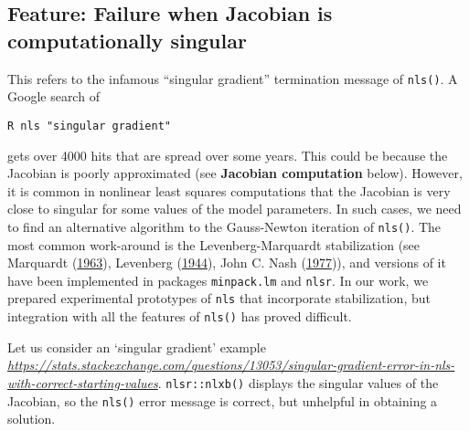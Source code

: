 \documentclass[
]{article}
\begin{document}
\hypertarget{feature-failure-when-jacobian-is-computationally-singular}{%
\subsection{Feature: Failure when Jacobian is computationally
singular}\label{feature-failure-when-jacobian-is-computationally-singular}}

This refers to the infamous ``singular gradient'' termination message of
\texttt{nls()}. A Google search of

\begin{verbatim}
R nls "singular gradient"
\end{verbatim}

gets over 4000 hits that are spread over some years. This could be
because the Jacobian is poorly approximated (see \textbf{Jacobian
computation} below). However, it is common in nonlinear least squares
computations that the Jacobian is very close to singular for some values
of the model parameters. In such cases, we need to find an alternative
algorithm to the Gauss-Newton iteration of \texttt{nls()}. The most
common work-around is the Levenberg-Marquardt stabilization (see
Marquardt (\protect\hyperlink{ref-Marquardt1963}{1963}), Levenberg
(\protect\hyperlink{ref-Levenberg1944}{1944}), John C. Nash
(\protect\hyperlink{ref-jn77ima}{1977})), and versions of it have been
implemented in packages \texttt{minpack.lm} and \texttt{nlsr}. In our
work, we prepared experimental prototypes of \texttt{nls} that
incorporate stabilization, but integration with all the features of
\texttt{nls()} has proved difficult.

Let us consider an `singular gradient' example
\emph{\url{https://stats.stackexchange.com/questions/13053/singular-gradient-error-in-nls-with-correct-starting-values}}.
\texttt{nlsr::nlxb()} displays the singular values of the Jacobian, so
the \texttt{nls()} error message is correct, but unhelpful in obtaining
a solution.
\end{document}
